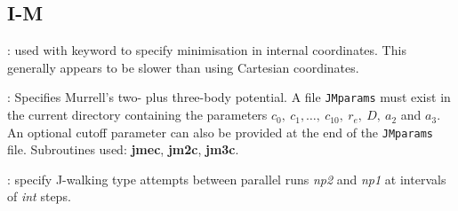 

\subsection{I-M}
: used with {} keyword to specify minimisation in internal 
coordinates. This generally appears to be
slower than using Cartesian coordinates.

: Specifies Murrell's two- plus three-body
potential.\cite{murrellm90,murrellr90,alderzijmr91,eggenjlm92,fengjm93}
A file {\tt JMparams} must
exist in the current directory containing the parameters $c_0,\ c_1,\ldots,\ c_{10},\ r_e,\
D,\ a_2$ and $a_3$. An optional cutoff parameter can also be provided at the end of the
{\tt JMparams} file.
Subroutines used: {\bf jmec}, {\bf jm2c}, {\bf jm3c}.

: specify J-walking type attempts between parallel runs {\it np2\/}
and {\it np1\/} at intervals of {\it int\/} steps.


